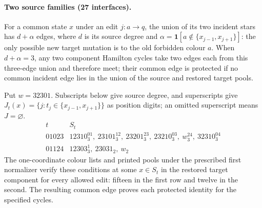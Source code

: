 \paragraph{Two source families (27 interfaces).}
For a common state $x$ under an edit $j:a\to q$, the union of its
two incident stars has $d+\alpha$ edges, where $d$ is its source
degree and $\alpha=\mathbf1[a\notin\{x_{j-1},x_{j+1}\}]$:
the only possible new target mutation is to the old forbidden colour $a$.
When $d+\alpha=3$, any two component Hamilton cycles take two edges
each from this three-edge union and therefore meet; their common edge
is protected if no common incident edge lies in the union of the source
and restored target pools.

Put $w=32301$. Subscripts below give source degree, and superscripts
give $J_t(x)=\{j:t_j\in\{x_{j-1},x_{j+1}\}\}$ as position digits;
an omitted superscript means $J=\varnothing$.
\[
\begin{array}{c|l}
t&S_t\\ \hline
01023&12310_3^{01},\ 23101_3^{12},\ 23201_3^{23},\ 23210_3^{03},\ w_3^{24},\ 32310_3^{04}\\
01124&12303_3^1,\ 23031_2,\ w_2
\end{array}
\]
The one-coordinate colour lists and printed pools under the prescribed
first normalizer verify these conditions at some $x\in S_t$ in the
restored target component for every allowed edit: fifteen in the first
row and twelve in the second. The resulting common edge proves each
protected identity for the specified cycles.

